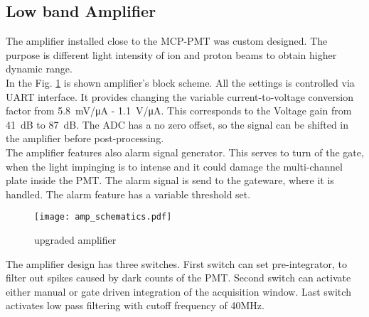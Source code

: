 \subsection{Low band Amplifier}
The amplifier installed close to the MCP-PMT was custom designed. The purpose
is different light intensity of ion and proton beams to obtain higher dynamic
range. \\ 
In the Fig. \ref{fig:amp_schematics} is shown amplifier's block scheme. All the
settings is controlled via UART interface. It provides changing the variable
current-to-voltage conversion factor from \SI{5.8}{mV/\micro A} -
\SI{1.1}{V/\micro A}. This corresponds to the Voltage gain from \SI{41}{dB} to
\SI{87}{dB}. The ADC has a no zero offset, so the signal can be shifted in the
amplifier before post-processing.\\
The amplifier features also alarm signal generator. This serves to turn of the
gate, when the light impinging is to intense and it could damage the
multi-channel plate inside the PMT. The alarm signal is send to the gateware,
where it is handled. The alarm feature has a variable threshold set.   
\begin{figure}[!tbh]
    \centering
    \texttt{[image: amp\_schematics.pdf]}
    \caption{upgraded amplifier}
    \label{fig:amp_schematics}
\end{figure}
The amplifier design has three switches. First switch can set pre-integrator,
to filter out spikes caused by dark counts of the PMT. Second switch can
activate either manual or gate driven integration of the acquisition window.  
Last switch activates low pass filtering with cutoff frequency of 40MHz.

